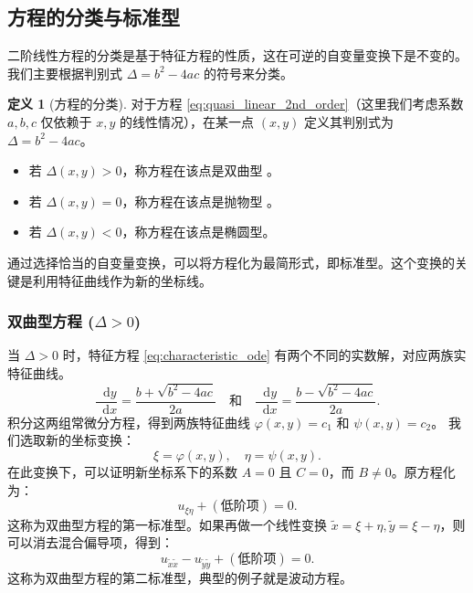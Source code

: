 \documentclass[12pt,a4paper]{article}
\newcommand{\diff}{\mathop{}\!\mathrm{d}}
\numberwithin{subsection}{section}   %
\numberwithin{subsubsection}{subsection}
\theoremstyle{plain}
\theoremstyle{definition}
\newtheorem{definition}[theorem]{定义}
\theoremstyle{remark}
\theoremstyle{remark}
\begin{document}
	
	\subsection{方程的分类与标准型}
	二阶线性方程的分类是基于特征方程的性质，这在可逆的自变量变换下是不变的。我们主要根据判别式 \(\Delta = b^2 - 4ac\) 的符号来分类。
	\begin{definition}[方程的分类]
		对于方程 \eqref{eq:quasi_linear_2nd_order}（这里我们考虑系数 \(a,b,c\) 仅依赖于 \(x,y\) 的线性情况），在某一点 \((x,y)\) 定义其判别式为 \(\Delta = b^2 - 4ac\)。
		\begin{itemize}
			\item 若 \(\Delta(x,y) > 0\)，称方程在该点是双曲型 。
			\item 若 \(\Delta(x,y) = 0\)，称方程在该点是抛物型 。
			\item 若 \(\Delta(x,y) < 0\)，称方程在该点是椭圆型。
		\end{itemize}
	\end{definition}
	通过选择恰当的自变量变换，可以将方程化为最简形式，即标准型。这个变换的关键是利用特征曲线作为新的坐标线。
	
	\subsubsection{双曲型方程 (\texorpdfstring{$\Delta > 0$}{Delta > 0})}
	当 \(\Delta > 0\) 时，特征方程 \eqref{eq:characteristic_ode} 有两个不同的实数解，对应两族实特征曲线。
	\[
	\frac{\diff y}{\diff x} = \frac{b + \sqrt{b^2-4ac}}{2a} \quad \text{和} \quad \frac{\diff y}{\diff x} = \frac{b - \sqrt{b^2-4ac}}{2a}.
	\]
	积分这两组常微分方程，得到两族特征曲线 \(\varphi(x,y) = c_1\) 和 \(\psi(x,y) = c_2\)。
	我们选取新的坐标变换：
	\[
	\xi = \varphi(x,y), \quad \eta = \psi(x,y).
	\]
	在此变换下，可以证明新坐标系下的系数 \(A=0\) 且 \(C=0\)，而 \(B \neq 0\)。原方程化为：
	\begin{equation}\label{eq:hyperbolic_canonical_1}
		u_{\xi\eta} + (\text{低阶项}) = 0.
	\end{equation}
	这称为双曲型方程的第一标准型。如果再做一个线性变换 \(\tilde{x} = \xi+\eta, \tilde{y}=\xi-\eta\)，则可以消去混合偏导项，得到：
	\begin{equation}\label{eq:hyperbolic_canonical_2}
		u_{\tilde{x}\tilde{x}} - u_{\tilde{y}\tilde{y}} + (\text{低阶项}) = 0.
	\end{equation}
	这称为双曲型方程的第二标准型，典型的例子就是波动方程。
	
\end{document}

